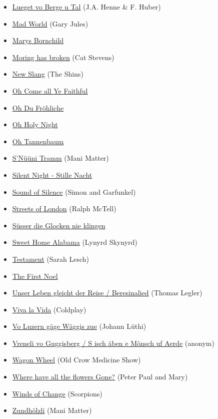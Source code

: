 \documentclass[
]{book}
\begin{document}
\begin{itemize}
\item
  \protect\hyperlink{volsklieder-lueged-vo-berge-u-tal}{Lueget vo Berge u Tal} (J.A. Henne \& F. Huber)
\item
  \protect\hyperlink{selected-songs-mad-world}{Mad World} (Gary Jules)
\item
  \protect\hyperlink{weihnachten-marys-bornchild}{Marys Bornchild}
\item
  \protect\hyperlink{classics-morning-has-broken}{Moring has broken} (Cat Stevens)
\item
  \protect\hyperlink{selected-songs-new-slang}{New Slang} (The Shins)
\item
  \protect\hyperlink{weihnachten-oh-come-all-ye-faithful}{Oh Come all Ye Faithful}
\item
  \protect\hyperlink{weihnachten-oh-du-froehliche}{Oh Du Fröhliche}
\item
  \protect\hyperlink{weihnachten-oh-holy-night}{Oh Holy Night}
\item
  \protect\hyperlink{weihnachten-oh-tannenbaum}{Oh Tannenbaum}
\item
  \protect\hyperlink{mundart-und-deutsch-nueni-tramm}{S'Nüüni Tramm} (Mani Matter)
\item
  \protect\hyperlink{weihnachten-silent-night}{Silent Night - Stille Nacht}
\item
  \protect\hyperlink{classics-sound-of-silence}{Sound of Silence} (Simon and Garfunkel)
\item
  \protect\hyperlink{classics-streets-of-london}{Streets of London} (Ralph McTell)
\item
  \protect\hyperlink{weihnachten-suesser-die-glocken-nie-klingen}{Süsser die Glocken nie klingen}
\item
  \protect\hyperlink{classics-sweet-home-alabama}{Sweet Home Alabama} (Lynyrd Skynyrd)
\item
  \protect\hyperlink{mundart-und-deutsch-das-testament}{Testament} (Sarah Lesch)
\item
  \protect\hyperlink{weihnachten-the-first-noel}{The First Noel}
\item
  \protect\hyperlink{mundart-und-deutsch-beresinalied}{Unser Leben gleicht der Reise / Beresinalied} (Thomas Legler)
\item
  \protect\hyperlink{selected-songs-viva-la-vida}{Viva la Vida} (Coldplay)
\item
  \protect\hyperlink{volsklieder-vo-luzern}{Vo Luzern gäge Wäggis zue} (Johann Lüthi)
\item
  \protect\hyperlink{volsklieder-guggisberg}{Vreneli vo Guggisberg / S isch äben e Mönsch uf Aerde} (anonym)
\item
  \protect\hyperlink{selected-songs-wagon-wheel}{Wagon Wheel} (Old Crow Medicine Show)
\item
  \protect\hyperlink{classics-where-have-all-the-flowers-gone}{Where have all the flowers Gone?} (Peter Paul and Mary)
\item
  \protect\hyperlink{classics-wind-of-change}{Winds of Change} (Scorpions)
\item
  \protect\hyperlink{mundart-und-deutsch-s-zundhoelzli}{Zundhölzli} (Mani Matter)
\end{itemize}
\end{document}
